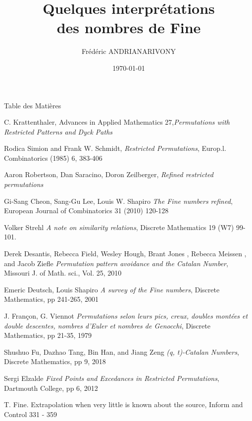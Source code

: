 \documentclass[10pt,aspectration=169]{beamer}
\title[Nombres de Fine]{Quelques interprétations \\des nombres de Fine}
\author[Frédéric]{Frédéric ANDRIANARIVONY}
\institute[fac. Science]{Département Mathématiques et informatiques}
\date{\today}
\begin{document}
    \begin{frame}
        \titlepage
    \end{frame}

    \begin{frame}{Table des Matières}
        \tableofcontents
    \end{frame}






\begin{thebibliography}{100} %
	 C. Krattenthaler, Advances in Applied Mathematics 27,\emph{Permutations with
		Restricted Patterns and Dyck Paths}

	 Rodica Simion and Frank W. Schmidt, \emph{ Restricted Permutations}, Europ.l.
	Combinatorics (1985) 6, 383-406

	Aaron Robertson, Dan Saracino, Doron Zeilberger, \emph{Refined restricted permutations}

	 Gi-Sang Cheon, Sang-Gu Lee, Louis W. Shapiro \emph{The Fine numbers refined}, European
	Journal of Combinatorics 31 (2010) 120-128

	 Volker Strehl \emph{A note on similarity relations},
	Discrete Mathematics 19 (W7) 99-101.

	 Derek Desantis, Rebecca Field, Wesley Hough, Brant Jones , Rebecca Meissen , and Jacob Ziefle \emph{Permutation pattern avoidance and the Catalan Number},
	Missouri J. of Math. sci., Vol. 25, 2010

	 Emeric Deutsch, Louis Shapiro \emph{A survey of the Fine numbers},
	Discrete Mathematics, pp 241-265, 2001

	 J. Françon, G. Viennot \emph{Permutations selon leurs pics, creux, doubles montées et double descentes, nombres d’Euler et nombres de Genocchi},
	Discrete Mathematics, pp 21-35, 1979

	 Shushuo Fu, Dazhao Tang, Bin Han, and Jiang Zeng
	\emph{(q, t)-Catalan Numbers},
	Discrete Mathematics, pp 9, 2018

	 Sergi Elzalde \emph{Fixed Points and Excedances in Restricted Permutations},
	Dartmouth College, pp 6, 2012

	 T. Fine. Extrapolation when very little is known about the source, Inform and Control 331 - 359

\end{thebibliography}
\end{document}
